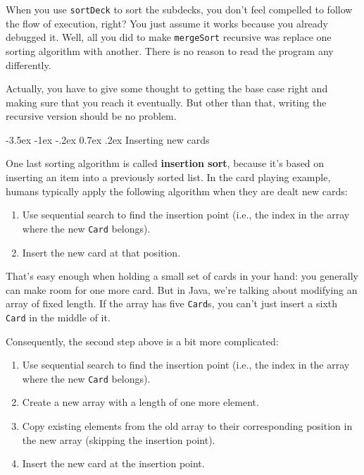 \documentclass[12pt]{book}
\makeatletter
\theoremstyle{exercise}
\newcommand{\java}[1]{\verb"#1"}
\renewcommand{\section}{\@startsection {section}{1}{\z@}%
    {-3.5ex \@plus -1ex \@minus -.2ex}%
    {0.7ex \@plus.2ex}%
    {\normalfont\Large\bfseries}}
\newcommand{\java}[1]{\lstinline{#1}} %
\makeatother
\begin{document}
When you use \java{sortDeck} to sort the subdecks, you don't feel compelled to follow the flow of execution, right?
You just assume it works because you already debugged it.
Well, all you did to make \java{mergeSort} recursive was replace one sorting algorithm with another.
There is no reason to read the program any differently.

Actually, you have to give some thought to getting the base case right and making sure that you reach it eventually.
But other than that, writing the recursive version should be no problem.


\section{Inserting new cards}


One last sorting algorithm is called {\bf insertion sort}, because it's based on inserting an item into a previously sorted list.
In the card playing example, humans typically apply the following algorithm when they are dealt new cards:

\begin{enumerate}
\item Use sequential search to find the insertion point (i.e., the index in the array where the new \java{Card} belongs).
\item Insert the new card at that position.
\end{enumerate}

That's easy enough when holding a small set of cards in your hand: you generally can make room for one more card.
But in Java, we're talking about modifying an array of fixed length.
If the array has five \java{Card}s, you can't just insert a sixth \java{Card} in the middle of it.

Consequently, the second step above is a bit more complicated:

\begin{enumerate}
\item Use sequential search to find the insertion point (i.e., the index in the array where the new \java{Card} belongs).
\item Create a new array with a length of one more element.
\item Copy existing elements from the old array to their corresponding position in the new array (skipping the insertion point).
\item Insert the new card at the insertion point.
\end{enumerate}
\end{document}
